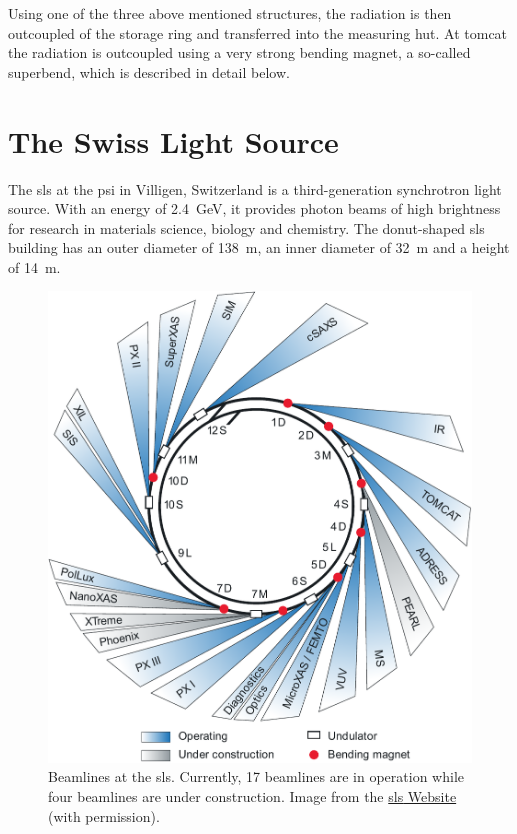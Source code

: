 Using one of the three above mentioned structures, the radiation is then outcoupled of the storage ring and transferred into the measuring hut. At \ac{tomcat} the radiation is outcoupled using a very strong bending magnet, a so-called superbend, which is described in detail below.

\section{The Swiss Light Source}
The \ac{sls} at the \ac{psi} in Villigen, Switzerland is a third-generation synchrotron light source. With an energy of \SI{2.4}{\giga\electronvolt}, it provides photon beams of high brightness for research in materials science, biology and chemistry. The donut-shaped \ac{sls} building has an outer diameter of \SI{138}{\meter}, an inner diameter of \SI{32}{\meter} and a height of \SI{14}{\meter}. 

\renewcommand{\imsize}{0.618\linewidth}%
\begin{figure}%
	\centering
	\includegraphics[width=\imsize]{img/sls_strahllinien_e_innererRing1108_crop_edit}
	\caption[Beamlines at the \acs{sls}]{Beamlines at the \ac{sls}. Currently, 17 beamlines are in operation while four beamlines are under construction. Image from the \href{http://sls.web.psi.ch/view.php/beamlines/}{\ac{sls} Website}~\cite{wwwsls} (with permission).}
	\label{fig:beamlines}
\end{figure}%


